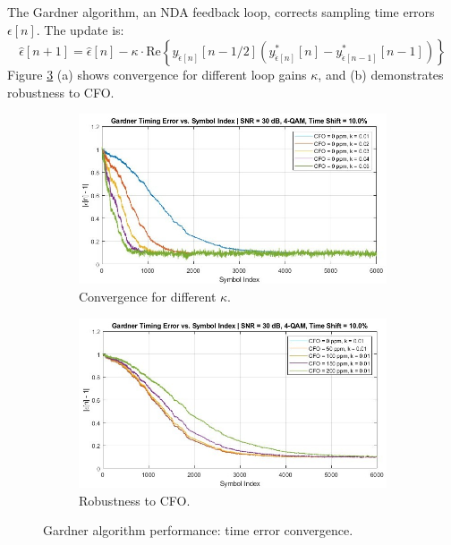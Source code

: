 \documentclass[11pt]{article}
\begin{document}
			The Gardner algorithm, an NDA feedback loop, corrects sampling time errors $\epsilon[n]$. The update is:
			\begin{equation}
				\hat{\epsilon}[n+1] = \hat{\epsilon}[n] - \kappa \cdot \text{Re} \left\{ y_{\hat{\epsilon}[n]}[n-1/2] \left( y_{\hat{\epsilon}[n]}^{*}[n] - y_{\hat{\epsilon}[n-1]}^{*}[n-1] \right) \right\}
			\end{equation}
			Figure \ref{fig:gardner_performance} (a) shows convergence for different loop gains $\kappa$, and (b) demonstrates robustness to CFO.
			
			\begin{figure}[H]
				\centering
				\begin{subfigure}[b]{0.48\textwidth}
					\centering
					\includegraphics[width=\linewidth]{Images/Gardner_k_list.jpg} 
					\caption{Convergence for different $\kappa$.}
					\label{fig:gardner1_compact}
				\end{subfigure}
				\hfill
				\begin{subfigure}[b]{0.48\textwidth}
					\centering
					\includegraphics[width=\linewidth]{Images/Gardner_CFO_robust.jpg} 
					\caption{Robustness to CFO.}
					\label{fig:gardner2_compact}
				\end{subfigure}
				\caption{Gardner algorithm performance: time error convergence.}
				\label{fig:gardner_performance}
			\end{figure}
			
\end{document}
